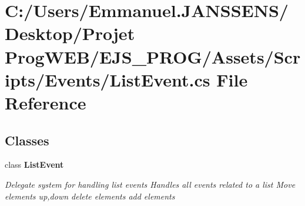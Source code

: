 \section{C\+:/\+Users/\+Emmanuel.J\+A\+N\+S\+S\+E\+N\+S/\+Desktop/\+Projet Prog\+W\+E\+B/\+E\+J\+S\+\_\+\+P\+R\+O\+G/\+Assets/\+Scripts/\+Events/\+List\+Event.cs File Reference}
\label{_list_event_8cs}
\subsection*{Classes}
\begin{DoxyCompactItemize}
\item 
class \textbf{ List\+Event}
\begin{DoxyCompactList}\small\item\em Delegate system for handling list events Handles all events related to a list Move elements up,down delete elements add elements \end{DoxyCompactList}\end{DoxyCompactItemize}
